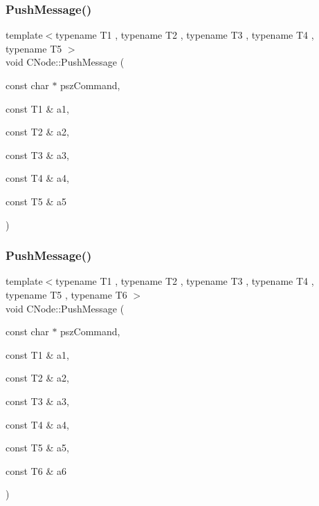 \subsubsection{\texorpdfstring{Push\+Message()}{PushMessage()}\hspace{0.1cm}{\footnotesize\ttfamily [6/13]}}
{\footnotesize\ttfamily template$<$typename T1 , typename T2 , typename T3 , typename T4 , typename T5 $>$ \\
void C\+Node\+::\+Push\+Message (\begin{DoxyParamCaption}\item[{const char $\ast$}]{psz\+Command,  }\item[{const T1 \&}]{a1,  }\item[{const T2 \&}]{a2,  }\item[{const T3 \&}]{a3,  }\item[{const T4 \&}]{a4,  }\item[{const T5 \&}]{a5 }\end{DoxyParamCaption})\hspace{0.3cm}{\ttfamily [inline]}}

\mbox{\label{class_c_node_a4addbff355c502fb2f8c10451e76373d}} 
\subsubsection{\texorpdfstring{Push\+Message()}{PushMessage()}\hspace{0.1cm}{\footnotesize\ttfamily [7/13]}}
{\footnotesize\ttfamily template$<$typename T1 , typename T2 , typename T3 , typename T4 , typename T5 , typename T6 $>$ \\
void C\+Node\+::\+Push\+Message (\begin{DoxyParamCaption}\item[{const char $\ast$}]{psz\+Command,  }\item[{const T1 \&}]{a1,  }\item[{const T2 \&}]{a2,  }\item[{const T3 \&}]{a3,  }\item[{const T4 \&}]{a4,  }\item[{const T5 \&}]{a5,  }\item[{const T6 \&}]{a6 }\end{DoxyParamCaption})\hspace{0.3cm}{\ttfamily [inline]}}


